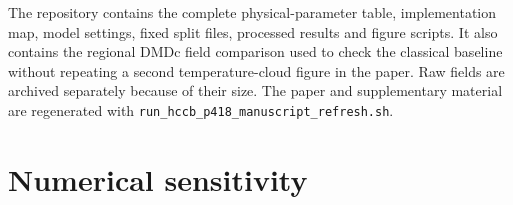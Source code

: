 The repository contains the complete physical-parameter table, implementation
map, model settings, fixed split files, processed results and figure scripts.
It also contains the regional DMDc field comparison used to check the classical
baseline without repeating a second temperature-cloud figure in the paper.
Raw \OpenFOAM{} fields are archived separately because of their size. The paper
and supplementary material are regenerated with
\texttt{run\_hccb\_p418\_manuscript\_refresh.sh}.

\section{Numerical sensitivity}



